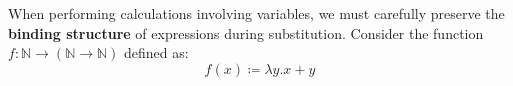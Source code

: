 





When performing calculations involving variables, we must carefully preserve the \textbf{binding structure} of expressions during substitution. Consider the function $f : \mathbb{N} \to (\mathbb{N} \to \mathbb{N})$ defined as:
$$ f(x) \coloneqq \lambda y. x + y $$

